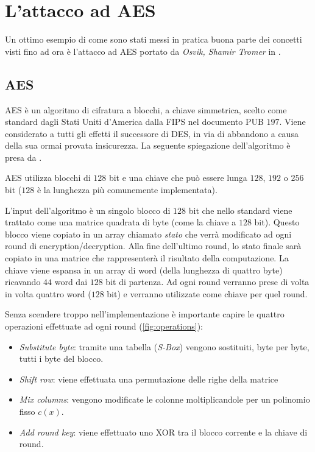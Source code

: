 		\section{L'attacco ad AES}
			Un ottimo esempio di come sono stati messi in pratica buona parte dei concetti visti fino ad ora è l'attacco ad \ac{AES} portato da \emph{Osvik, Shamir  Tromer} in \cite{osvik2006cache}.
			
			\subsection{AES}
				\ac{AES} è un algoritmo di cifratura a blocchi, a chiave simmetrica, scelto come standard dagli Stati Uniti d'America dalla \ac{FIPS} nel documento PUB $197$\cite{pub2001197}. Viene considerato a tutti gli effetti il successore di \ac{DES}, in via di abbandono a causa della sua ormai provata insicurezza\cite{kumar2006breaking,gilmore1998cracking}. La seguente spiegazione dell'algoritmo è presa da \cite{stallings2012computer}.
				
				\ac{AES} utilizza blocchi di $128$ bit e una chiave che può essere lunga $128$, $192$ o $256$ bit ($128$ è la lunghezza più comunemente implementata).
			
				L'input dell'algoritmo è un singolo blocco di $128$ bit che nello standard viene trattato come una matrice quadrata di byte (come la chiave a $128$ bit). Questo blocco viene copiato in un array chiamato \emph{stato} che verrà modificato ad ogni round di encryption/decryption. Alla fine dell'ultimo round, lo stato finale sarà copiato in una matrice che rappresenterà il risultato della computazione. La chiave viene espansa in un array di word (della lunghezza di quattro byte) ricavando $44$ word dai $128$ bit di partenza. Ad ogni round verranno prese di volta in volta quattro word ($128$ bit) e verranno utilizzate come chiave per quel round.
				
				Senza scendere troppo nell'implementazione è importante capire le quattro operazioni effettuate ad ogni round (\cref{fig:operations}):
				
				\begin{itemize}
					\item \emph{Substitute byte}: tramite una tabella (\emph{S-Box}) vengono sostituiti, byte per byte, tutti i byte del blocco.
					\item \emph{Shift row}: viene effettuata una permutazione delle righe della matrice
					\item \emph{Mix columns}: vengono modificate le colonne moltiplicandole per un polinomio fisso $c(x)$.
					\item \emph{Add round key}: viene effettuato uno XOR tra il blocco corrente e la chiave di round.
				\end{itemize}
			
